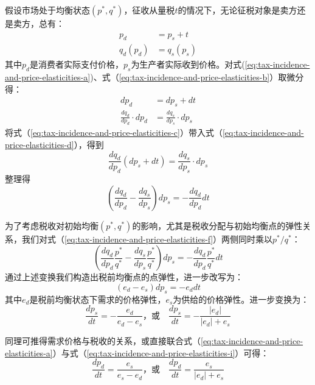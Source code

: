 假设市场处于均衡状态$(p^*, q^*)$，征收从量税$t$的情况下，无论征税对象是卖方还是卖方，总有：
\begin{align}
p_d &= p_s + t\label{eq:tax-incidence-and-price-elasticities-a}\\
{q_d}(p_d) &= {q_s}(p_s)\label{eq:tax-incidence-and-price-elasticities-b}
\end{align}
其中$p_d$是消费者实际支付价格，$p_s$为生产者实际收到价格。对式(\ref{eq:tax-incidence-and-price-elasticities-a})、式（\ref{eq:tax-incidence-and-price-elasticities-b}）取微分得：
\begin{align}
d{p_d} &= d{p_s} + dt \label{eq:tax-incidence-and-price-elasticities-c}\\
\frac{d{q_d}}{d{p_d}} \cdot d{p_d} &= \frac{d{q_s}}{d{p_s}} \cdot d{p_s} \label{eq:tax-incidence-and-price-elasticities-d}
\end{align}
将式（\ref{eq:tax-incidence-and-price-elasticities-c}）带入式（\ref{eq:tax-incidence-and-price-elasticities-d}），得到
\[
\frac{d{q_d}}{d{p_d}} (d{{p_s}+dt}) = \frac{d{q_s}}{d{p_s}} \cdot d{p_s}
\]
整理得
\begin{equation}
(\frac{dq_d}{dp_d} - \frac{dq_s}{dp_s}){dp_s} = - \frac{dq_d}{dp_d} dt
\label{eq:tax-incidence-and-price-elasticities-f}
\end{equation}

为了考虑税收对初始均衡$(p^*, q^*)$的影响，尤其是税收分配与初始均衡点的弹性关系，我们对式（\ref{eq:tax-incidence-and-price-elasticities-f}）两侧同时乘以${p^*}/{q^*}$：
\[
(\frac{dq_d}{dp_d} \frac{p^*}{q^*} - \frac{dq_s}{dp_s} \frac{p^*}{q^*}){dp_s} = - \frac{dq_d}{dp_d} \frac{p^*}{q^*} dt
\]
通过上述变换我们构造出税前均衡点的点弹性，进一步改写为：
\[
(e_d - e_s) dp_s = - e_d dt
\]
其中$e_d$是税前均衡状态下需求的价格弹性，$e_s$为供给的价格弹性。进一步变换为：
\begin{equation}
\frac{dp_s}{dt} = -\frac{e_d}{e_d - e_s}\text{，或}\quad \frac{dp_s}{dt} = -\frac{\left| e_d \right|}{\left| e_d \right| + e_s}
\label{eq:tax-incidence-and-price-elasticities-i}
\end{equation}

同理可推得需求价格与税收的关系，或直接联合式（\ref{eq:tax-incidence-and-price-elasticities-a}）与式（\ref{eq:tax-incidence-and-price-elasticities-i}）可得：
\begin{equation}
\frac{dp_d}{dt} = \frac{e_s}{e_s - e_d}\text{，或}\quad \frac{dp_d}{dt} = \frac{e_s}{\left| e_d \right| + e_s}
\label{eq:tax-incidence-and-price-elasticities-j}
\end{equation}

